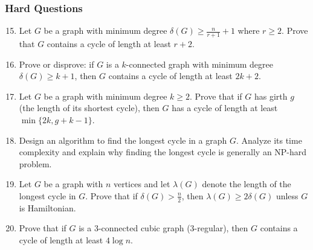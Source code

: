 \documentclass{article}
\theoremstyle{definition}
\begin{document}
\subsubsection{Hard Questions}
\begin{enumerate}\setcounter{enumi}{14}
\item Let $G$ be a graph with minimum degree $\delta(G) \geq \frac{n}{r+1} + 1$ where $r \geq 2$. Prove that $G$ contains a cycle of length at least $r+2$.

\item Prove or disprove: if $G$ is a $k$-connected graph with minimum degree $\delta(G) \geq k+1$, then $G$ contains a cycle of length at least $2k+2$.

\item Let $G$ be a graph with minimum degree $k \geq 2$. Prove that if $G$ has girth $g$ (the length of its shortest cycle), then $G$ has a cycle of length at least $\min\{2k, g+k-1\}$.

\item Design an algorithm to find the longest cycle in a graph $G$. Analyze its time complexity and explain why finding the longest cycle is generally an NP-hard problem.

\item Let $G$ be a graph with $n$ vertices and let $\lambda(G)$ denote the length of the longest cycle in $G$. Prove that if $\delta(G) > \frac{n}{2}$, then $\lambda(G) \geq 2\delta(G)$ unless $G$ is Hamiltonian.

\item Prove that if $G$ is a 3-connected cubic graph (3-regular), then $G$ contains a cycle of length at least $4\log n$.
\end{enumerate}
\end{document}
